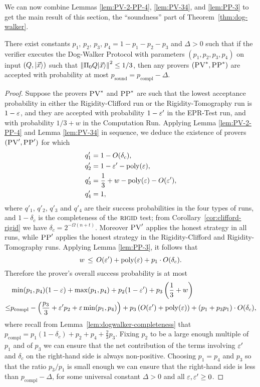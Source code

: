 We can now combine Lemmas \ref{lem:PV-2-PP-4}, \ref{lem:PV-34}, and \ref{lem:PP-3} to get the main result of this section, the ``soundness'' part of Theorem~\ref{thm:dog-walker}.

\begin{lemma}\label{lem:dogwalker-soundness}
 There exist constants $p_1$, $p_2$, $p_3$, $p_4=1-p_1-p_2-p_3$ and $\Delta>0$ such that if the verifier executes the Dog-Walker Protocol with parameters $(p_1,p_2,p_3,p_4)$ on input $(Q,|\vec{x}\rangle)$ such that $\left\|\Pi_0 Q|\vec{x}\rangle\right\|^2\leq 1/3$, then any provers $(\textsc{PV}^*,\textsc{PP}^*)$ are accepted with probability at most $p_{\mathrm{sound}}=p_{\mathrm{compl}}-\Delta$. 
\end{lemma}

\begin{proof}
Suppose the provers $\textsc{PV}^*$ and $\textsc{PP}^*$ are such that the lowest acceptance probability in either the Rigidity-Clifford run or the Rigidity-Tomography run is $1- \varepsilon$, and they are accepted with probability $1-\varepsilon'$ in the EPR-Test run, and with probability $1/3+w$ in the Computation Run. Applying  Lemma \ref{lem:PV-2-PP-4} and Lemma \ref{lem:PV-34} in sequence, we deduce the existence of provers $(\textsc{PV}',\textsc{PP}')$ for which
\begin{align*}
q_1' &= 1- O(\delta_c), \\  q_2' &= 1-\varepsilon'- \operatorname{poly}(\varepsilon), \\ q_3' &= \frac13+w-
  \operatorname{poly}(\varepsilon)-O(\varepsilon'),\\ q_4' &= 1,
\end{align*}
where $q'_1$, $q'_2$, $q'_3$ and $q'_4$ are their success probabilities in the
  four types of runs, and $1-\delta_c$ is the completeness of the
  $\textsc{rigid}$ test; from Corollary~\ref{cor:clifford-rigid} we have $\delta_c = 2^{-\Omega(n+t)}$. Moreover $\textsc{PV}'$ applies the honest strategy in all runs, while $\textsc{PP}'$ applies the honest strategy in the Rigidity-Clifford and Rigidity-Tomography runs. Applying Lemma \ref{lem:PP-3}, it follows that 
$$w \,\leq\, O(\varepsilon') + \operatorname{poly}(\varepsilon) +p_1 \cdot O(\delta_c).$$
Therefore the prover's overall success probability is at most 
\begin{align*}
& \min(p_1,p_4)(1-\varepsilon)+\max(p_1,p_4) + p_2(1-\varepsilon')+p_3\left(\frac{1}{3}+w\right) \\
\leq & p_{\mathrm{compl}} - \left( \frac{p_3}{3} + \varepsilon' p_2+\varepsilon\min(p_1,p_4)\right)+ p_3\left(O(\varepsilon')+\operatorname{poly}(\varepsilon)\right)+ (p_1 + p_3p_1) \cdot O(\delta_c),
\end{align*}
where recall from Lemma~\ref{lem:dogwalker-completeness} that
  $p_{\mathrm{compl}} =  p_1(1-\delta_c)+p_2+p_4+\frac{2}{3}p_3$. Fixing $p_2$
  to be a large enough multiple of $p_1$ and of $p_3$ we can ensure that the net contribution
  of the terms involving $\varepsilon'$ and $\delta_c$ on the right-hand side is always
  non-positive. Choosing $p_1=p_4$ and $p_3$ so that the ratio $p_3/p_1$ is small
  enough we can ensure that the right-hand side is less than $p_{\mathrm{compl}}
  -\Delta$, for some universal constant $\Delta>0$ and all $\varepsilon,\varepsilon'\geq 0$.
\end{proof}




